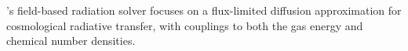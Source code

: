 \enzo's field-based radiation solver focuses on
a flux-limited diffusion approximation for cosmological radiative
transfer, with couplings to both the gas energy and chemical number
densities.

